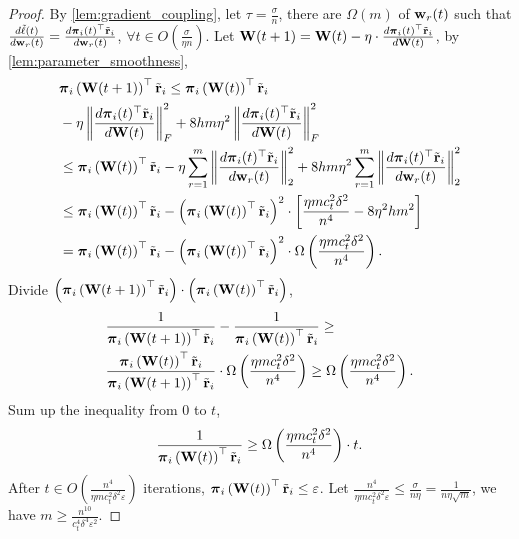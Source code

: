 \begin{proof}
    By \cref{lem:gradient_coupling}, let $\tau = \frac{\sigma}{n}$, there are $\Omega\left( m \right)$ of ${\mathbf{w}}_r(t)$ such that $\frac{d\tilde{\ell}(t)}{d {\mathbf{w}}_r(t)} = \frac{d {\boldsymbol{\pi}}_i(t)^\top {\tilde{\mathbf{r}}}_i}{d {\mathbf{w}}_r(t)}$, $\forall t \in O\left( \frac{\sigma}{\eta n} \right)$. Let ${\mathbf{W}}(t+1) = {\mathbf{W}}(t) - \eta \cdot \frac{d {\boldsymbol{\pi}}_i(t)^\top {\tilde{\mathbf{r}}}_i}{d {\mathbf{W}}(t)}$, by \cref{lem:parameter_smoothness},
\begin{equation*}
\begin{split}
    &{\boldsymbol{\pi}}_i\left( {\mathbf{W}}(t+1) \right)^\top {\tilde{\mathbf{r}}}_i \le {\boldsymbol{\pi}}_i\left( {\mathbf{W}}(t) \right)^\top {\tilde{\mathbf{r}}}_i \\
    &- \eta \left\| \frac{d {\boldsymbol{\pi}}_i(t)^\top {\tilde{\mathbf{r}}}_i}{d {\mathbf{W}}(t)} \right\|_F^2 + 8 h m \eta^2 \left\| \frac{d {\boldsymbol{\pi}}_i(t)^\top {\tilde{\mathbf{r}}}_i}{d {\mathbf{W}}(t)} \right\|_F^2 \\
    &\le {\boldsymbol{\pi}}_i\left( {\mathbf{W}}(t) \right)^\top {\tilde{\mathbf{r}}}_i - \eta \sum\limits_{r=1}^{m}{ \left\| \frac{d {\boldsymbol{\pi}}_i(t)^\top {\tilde{\mathbf{r}}}_i}{d {\mathbf{w}}_r(t)} \right\|_2^2 } + 8 h m \eta^2 \sum\limits_{r=1}^{m}{ \left\| \frac{d {\boldsymbol{\pi}}_i(t)^\top {\tilde{\mathbf{r}}}_i}{d {\mathbf{w}}_r(t)} \right\|_2^2 } \\
    &\le {\boldsymbol{\pi}}_i\left( {\mathbf{W}}(t) \right)^\top {\tilde{\mathbf{r}}}_i - \left( {\boldsymbol{\pi}}_i\left( {\mathbf{W}}(t) \right)^\top {\tilde{\mathbf{r}}}_i \right)^2 \cdot \left[ \frac{\eta m c_t^2 \delta^2}{n^4} - 8 \eta^2 h m^2 \right] \\
    &= {\boldsymbol{\pi}}_i\left( {\mathbf{W}}(t) \right)^\top {\tilde{\mathbf{r}}}_i - \left( {\boldsymbol{\pi}}_i\left( {\mathbf{W}}(t) \right)^\top {\tilde{\mathbf{r}}}_i \right)^2 \cdot \Omega\left( \frac{\eta m c_t^2 \delta^2}{n^4} \right).
\end{split}
\end{equation*}
Divide $\left( {\boldsymbol{\pi}}_i\left( {\mathbf{W}}(t+1) \right)^\top {\tilde{\mathbf{r}}}_i\right) \cdot \left( {\boldsymbol{\pi}}_i\left( {\mathbf{W}}(t) \right)^\top {\tilde{\mathbf{r}}}_i \right)$,
\begin{equation*}
\begin{split}
    &\frac{1}{{\boldsymbol{\pi}}_i\left( {\mathbf{W}}(t+1) \right)^\top {\tilde{\mathbf{r}}}_i} - \frac{1}{{\boldsymbol{\pi}}_i\left( {\mathbf{W}}(t) \right)^\top {\tilde{\mathbf{r}}}_i} \ge \\
    &\frac{{\boldsymbol{\pi}}_i\left( {\mathbf{W}}(t) \right)^\top {\tilde{\mathbf{r}}}_i}{{\boldsymbol{\pi}}_i\left( {\mathbf{W}}(t+1) \right)^\top {\tilde{\mathbf{r}}}_i} \cdot \Omega\left( \frac{\eta m c_t^2 \delta^2}{n^4} \right) \ge \Omega\left( \frac{\eta m c_t^2 \delta^2}{n^4} \right).
\end{split}
\end{equation*}
Sum up the inequality from $0$ to $t$,
\begin{equation*}
\begin{split}
    \frac{1}{{\boldsymbol{\pi}}_i\left( {\mathbf{W}}(t) \right)^\top {\tilde{\mathbf{r}}}_i} \ge \Omega\left( \frac{\eta m c_t^2 \delta^2}{n^4} \right) \cdot t.
\end{split}
\end{equation*}
After $t \in O\left( \frac{n^4}{\eta m c_t^2 \delta^2 \varepsilon} \right)$ iterations, ${\boldsymbol{\pi}}_i\left( {\mathbf{W}}(t) \right)^\top {\tilde{\mathbf{r}}}_i \le \varepsilon$. Let $\frac{n^4}{\eta m c_t^2 \delta^2 \varepsilon} \le \frac{\sigma}{n \eta} = \frac{1}{n \eta \sqrt{m}}$, we have $m \ge \frac{n^{10}}{c_t^4 \delta^4 \varepsilon^2}$.
\end{proof}

